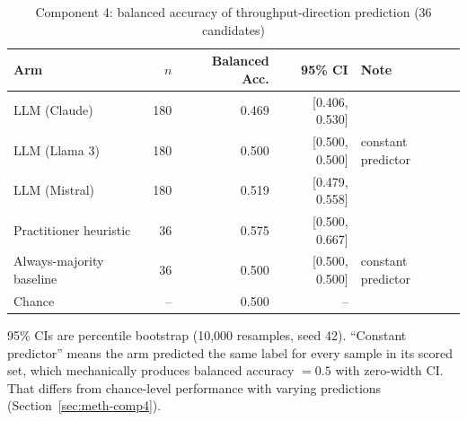 \begin{table}[ht]
\centering
\caption{Component 4: balanced accuracy of throughput-direction prediction (36 candidates)}
\label{tab:component4}
\small
\begin{tabular}{lrrrl}
\hline
\textbf{Arm} & \textbf{$n$} & \textbf{Balanced Acc.} & \textbf{95\% CI} & \textbf{Note} \\
\hline
LLM (Claude) & 180 & 0.469 & [0.406, 0.530] &  \\
LLM (Llama 3) & 180 & 0.500 & [0.500, 0.500] & constant predictor \\
LLM (Mistral) & 180 & 0.519 & [0.479, 0.558] &  \\
Practitioner heuristic & 36 & 0.575 & [0.500, 0.667] &  \\
Always-majority baseline & 36 & 0.500 & [0.500, 0.500] & constant predictor \\
Chance & -- & 0.500 & -- &  \\
\hline
\end{tabular}
\vspace{2mm}
\raggedright\footnotesize 95\% CIs are percentile bootstrap (10{,}000 resamples, seed 42). ``Constant predictor'' means the arm predicted the same label for every sample in its scored set, which mechanically produces balanced accuracy $=0.5$ with zero-width CI. That differs from chance-level performance with varying predictions (Section~\ref{sec:meth-comp4}).
\end{table}